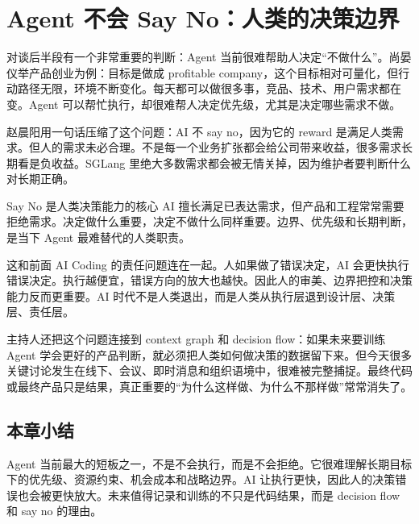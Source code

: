 \section{Agent 不会 Say No：人类的决策边界}

对谈后半段有一个非常重要的判断：Agent 当前很难帮助人决定“不做什么”。尚晏仪举产品创业为例：目标是做成 profitable company，这个目标相对可量化，但行动路径无限，环境不断变化。每天都可以做很多事，竞品、技术、用户需求都在变。Agent 可以帮忙执行，却很难帮人决定优先级，尤其是决定哪些需求不做。

赵晨阳用一句话压缩了这个问题：AI 不 say no，因为它的 reward 是满足人类需求。但人的需求未必合理。不是每一个业务扩张都会给公司带来收益，很多需求长期看是负收益。SGLang 里绝大多数需求都会被无情关掉，因为维护者要判断什么对长期正确。

\begin{importantbox}{Say No 是人类决策能力的核心}
AI 擅长满足已表达需求，但产品和工程常常需要拒绝需求。决定做什么重要，决定不做什么同样重要。边界、优先级和长期判断，是当下 Agent 最难替代的人类职责。
\end{importantbox}

这和前面 AI Coding 的责任问题连在一起。人如果做了错误决定，AI 会更快执行错误决定。执行越便宜，错误方向的放大也越快。因此人的审美、边界把控和决策能力反而更重要。AI 时代不是人类退出，而是人类从执行层退到设计层、决策层、责任层。

主持人还把这个问题连接到 context graph 和 decision flow：如果未来要训练 Agent 学会更好的产品判断，就必须把人类如何做决策的数据留下来。但今天很多关键讨论发生在线下、会议、即时消息和组织语境中，很难被完整捕捉。最终代码或最终产品只是结果，真正重要的“为什么这样做、为什么不那样做”常常消失了。

\subsection{本章小结}

Agent 当前最大的短板之一，不是不会执行，而是不会拒绝。它很难理解长期目标下的优先级、资源约束、机会成本和战略边界。AI 让执行更快，因此人的决策错误也会被更快放大。未来值得记录和训练的不只是代码结果，而是 decision flow 和 say no 的理由。

